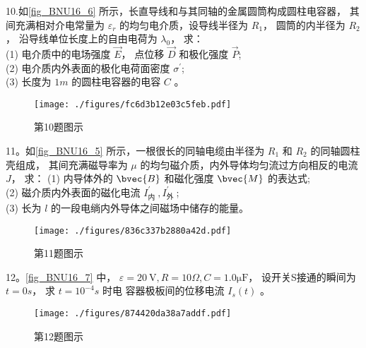 10.如\autoref{fig_BNU16_6} 所示，长直导线和与其同轴的金属圆筒构成圆柱电容器， 其间充满相对介电常量为 $\varepsilon_{r}$ 的均匀电介质，设导线半径为 $R_{1}$， 圆筒的内半径为 $R_{2}$， 沿导线单位长度上的自由电荷为 $\lambda_{0}$， 求：\\
(1) 电介质中的电场强度 $\vec{E}$， 点位移 $\vec{D}$ 和极化强度 $\vec{P}$;\\
(2) 电介质内外表面的极化电荷面密度 $\sigma^{\prime}$;\\
(3) 长度为 $1 m$ 的圆柱电容器的电容 $C$ 。
\begin{figure}[ht]
\centering
\texttt{[image: ./figures/fc6d3b12e03c5feb.pdf]}
\caption{第10题图示} \label{fig_BNU16_6}
\end{figure}

11。如\autoref{fig_BNU16_5} 所示，一根很长的同轴电缆由半径为 $R_{1}$ 和 $R_{2}$ 的同轴圆柱壳组成， 其间充满磁导率为 $\mu$ 的均匀磁介质，内外导体均匀流过方向相反的电流 $J$， 求：
(1) 内导体外的 $\bvec{B}$ 和磁化强度 $\bvec{M}$ 的表达式;\\
(2) 磁介质内外表面的磁化电流 $I_{\text {内 }}^{\prime}, I_{\text {外 }}^{\prime}$;\\
(3) 长为 $l$ 的一段电绱内外导体之间磁场中储存的能量。
\begin{figure}[ht]
\centering
\texttt{[image: ./figures/836c337b2880a42d.pdf]}
\caption{第11题图示} \label{fig_BNU16_5}
\end{figure}
12。\autoref{fig_BNU16_7} 中， $\varepsilon=20 \mathrm{~V}, R=10 \Omega, C=1.0\mathrm{\mu F}$， 设开关S接通的瞬间为 $t=0 s$， 求 $t=10^{-4} s$ 时电 容器极板间的位移电流 $I_{s}(t)$ 。
\begin{figure}[ht]
\centering
\texttt{[image: ./figures/874420da38a7addf.pdf]}
\caption{第12题图示} \label{fig_BNU16_7}
\end{figure}